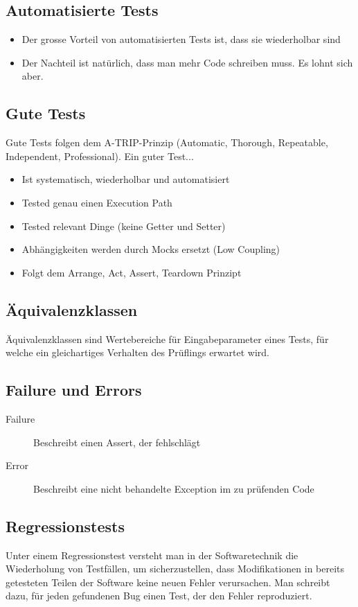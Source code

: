 \subsection{Automatisierte Tests}
\begin{itemize}
	\item Der grosse Vorteil von automatisierten Tests ist, dass sie wiederholbar sind
	\item Der Nachteil ist natürlich, dass man mehr Code schreiben muss. Es lohnt sich aber.
\end{itemize}


\subsection{Gute Tests}
Gute Tests folgen dem A-TRIP-Prinzip (Automatic, Thorough, Repeatable, Independent, Professional). Ein guter Test...
\begin{itemize}
	\item Ist systematisch, wiederholbar und automatisiert
	\item Tested genau einen Execution Path 
	\item Tested relevant Dinge (keine Getter und Setter) 
	\item Abhängigkeiten werden durch Mocks ersetzt (Low Coupling)
	\item Folgt dem Arrange, Act, Assert, Teardown Prinzipt
\end{itemize}

\subsection{Äquivalenzklassen}
Äquivalenzklassen sind Wertebereiche für Eingabeparameter eines Tests, für welche ein gleichartiges Verhalten des Prüflings erwartet wird.

\subsection{Failure und Errors}
\begin{description}
	\item[Failure] Beschreibt einen Assert, der fehlschlägt
	\item[Error] Beschreibt eine nicht behandelte Exception im zu prüfenden Code
\end{description}

\subsection{Regressionstests}
Unter einem Regressionstest versteht man in der Softwaretechnik die Wiederholung von Testfällen, um sicherzustellen, dass Modifikationen in bereits getesteten Teilen der Software keine neuen Fehler verursachen. Man schreibt dazu, für jeden gefundenen Bug einen Test, der den Fehler reproduziert.


